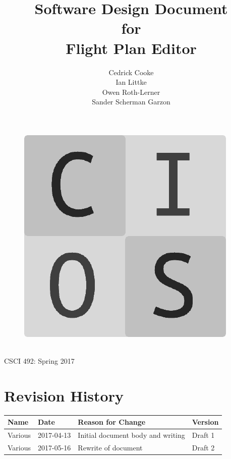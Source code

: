 \documentclass[12pt, letterpaper]{article}
\title{Software Design Document\\for\\Flight Plan Editor}
\date{}
\author{
Cedrick Cooke\\
Ian Littke\\
Owen Roth-Lerner\\
Sander Scherman Garzon\\
}
\makeatletter
\renewcommand{\maketitle}{\bgroup\setlength{\parindent}{0pt}
\thispagestyle{empty}
\null

  \begin{flushleft}
  \vspace{15mm}
  \vskip2mm
  \Huge{\textbf{\@title}}
  \vspace{7cm}
\begin{figure}[ht]
  \begin{minipage}[b]{0.45\linewidth}
    \includegraphics[width=.75\textwidth]{images/cios.png}
  \end{minipage}
  \hspace{0.5cm}
  \begin{minipage}[b][][c]{0.45\linewidth}
    \LARGE{\@author}
  \vspace{0.35cm}
  \end{minipage}
\end{figure}
\\CSCI 492: Spring 2017\\
  \end{flushleft}\egroup
}
\makeatother
\begin{document}
\maketitle

\newpage
\pagestyle{style2}
\setcounter{page}{1}
\section*{Revision History}
\begin{tabularx}{\textwidth}{l l X l}
\textbf{Name} & \textbf{Date} & \textbf{Reason for Change} & \textbf{Version} \\
\hline
\hline
Various & 2017-04-13 & Initial document body and writing & Draft 1 \\
Various & 2017-05-16 & Rewrite of document               & Draft 2  \\
\end{tabularx}
\end{document}
